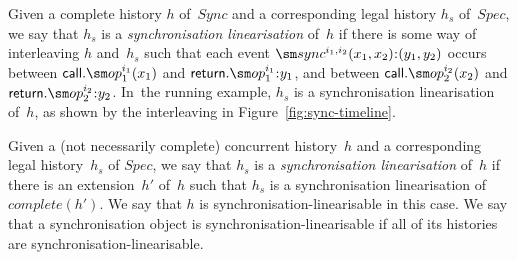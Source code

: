 Given a complete history $h$ of~$Sync$ and a corresponding legal history $h_s$
of~$Spec$, we say that $h_s$ is a \emph{synchronisation linearisation} of~$h$
if there is some way of interleaving $h$ and~$h_s$ such that each event
$\sync^{i_1, i_2}(x_1, x_2)\:: (y_1, y_2)$ occurs between
$\call.\op_1^{i_1}(x_1)$ and $\return.\op_1^{i_1}\::y_1$, and between
$\call.\op_2^{i_2}(x_2)$ and $\return.\op_2^{i_2}\::y_2$.
%
In~the running example, $h_s$ is a synchronisation linearisation of~$h$,
as shown by the interleaving in Figure~\ref{fig:sync-timeline}.

Given a (not necessarily complete) concurrent history~$h$ and a corresponding
legal history~$h_s$ of $Spec$, we say that $h_s$ is a \emph{synchronisation
  linearisation} of~$h$ if there is an extension~$h'$ of~$h$ such that $h_s$
is a synchronisation linearisation of $complete(h')$.
%
We say that $h$ is synchronisation-linearisable in this case.  We say that a
synchronisation object is synchronisation-linearisable if all of its histories
are synchronisation-linearisable.


